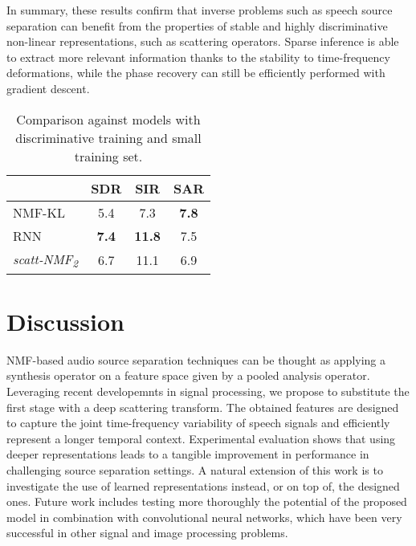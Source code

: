 In summary, these results confirm that inverse problems such as speech source separation 
can benefit from the properties of stable and highly discriminative non-linear representations, 
such as scattering operators. Sparse inference is able to extract more relevant information thanks 
to the stability to time-frequency deformations, while the phase recovery can still be efficiently performed
with gradient descent.



\begin{table}[tb]
\caption{Comparison against models with discriminative training 
and small training set. \label{ta:eval2}}
\vspace{-4.5ex}
\begin{center}
\footnotesize{
\begin{tabular}{l|c|c|c}
  \hline\hline
& SDR & SIR & SAR \\
\hline
NMF-KL     & 5.4 &   7.3 & {\bf 7.8} \\
\hline
RNN \cite{Huang_DNN_Separation_ICASSP2014} & {\bf 7.4}  &   {\bf 11.8} & 7.5  \\
\hline
\emph{scatt-NMF\textsubscript{2}} &  6.7 & 11.1  & 6.9 \\
  \hline\hline
\end{tabular}
}
\end{center}
\vspace{-4.0ex}
\end{table}


\section{Discussion}
NMF-based audio source separation techniques can be thought as applying a synthesis operator on a feature space
given by a pooled analysis operator. Leveraging recent developemnts in signal processing, we propose to substitute
the first stage with a deep scattering transform. 
The obtained features are designed to capture the joint time-frequency variability of speech signals
and efficiently represent a longer temporal context. Experimental evaluation shows that using deeper representations
leads to a tangible improvement in performance in challenging source separation settings.
A natural extension of this work is to investigate the use of learned representations instead, or on top of,
the designed ones.
%
Future work includes testing more thoroughly the potential of the proposed model in combination
with convolutional neural networks, which have been very successful in other signal and image processing problems.


